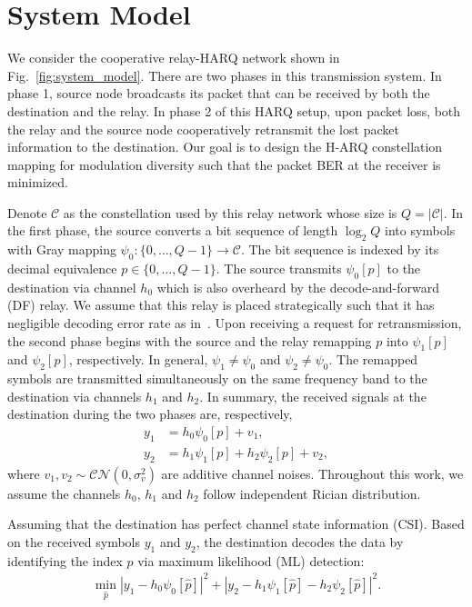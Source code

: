 \documentclass[journal]{IEEEtran}
\begin{document}

\section{System Model}
\label{sec:model}
We consider the cooperative relay-HARQ network shown in
Fig.~\ref{fig:system_model}. There are two phases in this transmission system.
In phase 1, source node broadcasts its packet that can be received by both the
destination and the relay. In phase 2 of this HARQ setup, upon packet loss,
both the relay and the source node cooperatively retransmit the lost packet
information to the destination. Our goal is to design the H-ARQ constellation
mapping for modulation diversity such that the packet BER at the receiver is
minimized.

Denote $\mathcal{C}$ as the constellation used by this relay network whose size
is $Q = |\mathcal{C}|$. In the first phase, the source converts a bit sequence
of length $\log_2Q$ into symbols with Gray mapping $\psi_0: \{0,\ldots,Q -
1\}\rightarrow \mathcal{C}$. The bit sequence is indexed by its decimal
equivalence $p\in \{0,\ldots,Q - 1\}$. The source transmits $\psi_0[p]$ to the
destination via channel $h_0$ which is also overheard by the decode-and-forward
(DF) relay. We assume that this relay is placed strategically such that it has
negligible decoding error rate as in~\cite{ryu2011ber, kim2009design}. Upon
receiving a request for retransmission, the second phase begins with
the source and the relay remapping $p$ into $\psi_1[p]$ and $\psi_2[p]$,
respectively.  In general,  $\psi_1\not=\psi_0$ and $\psi_2\not=\psi_0$. The
remapped symbols are transmitted simultaneously on the same frequency band to the
destination via channels $h_1$ and $h_2$. In summary, the received signals at the
destination during the two phases are, respectively, 
\begin{subequations}
    \begin{align}
       y_1 & = h_0\psi_0[p] + v_1, \\
       y_2 & = h_1\psi_1[p] + h_2\psi_2[p] + v_2,
    \end{align}
\end{subequations}
where $v_1, v_2\sim\mathcal{CN}(0,\sigma_v^2)$ are additive channel noises.
Throughout this work, we assume the channels $h_0$, $h_1$ and $h_2$ follow
independent Rician distribution.

Assuming that the destination has perfect channel state information (CSI). Based
on the received symbols $y_1$ and $y_2$,  the destination decodes the data by
identifying the index $p$ via maximum likelihood (ML) detection:
\begin{align}
    \min_{\hat{p}} |y_1 - h_0\psi_0[\hat{p}]|^2 + |y_2-
    h_1\psi_1[\hat{p}] - h_2\psi_2[\hat{p}]|^2.
    \label{eq:ML}
\end{align}
\end{document}
